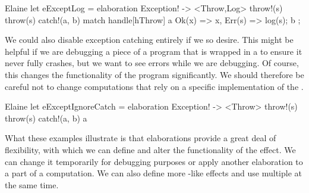 \begin{lst}{Elaine}
let eExceptLog = elaboration Exception! -> <Throw,Log> {
    throw!(s) { throw(s) }
    catch!(a, b) {
        match handle[hThrow] a {
            Ok(x) => x,
            Err(s) => {
                log(s);
                b
            }
        }
    }
};
\end{lst}
%
We could also disable exception catching entirely if we so desire. This might be helpful if we are debugging a piece of a program that is wrapped in a  to ensure it never fully crashes, but we want to see errors while we are debugging. Of course, this changes the functionality of the program significantly. We should therefore be careful not to change computations that rely on a specific implementation of the .

\begin{lst}{Elaine}
let eExceptIgnoreCatch = elaboration Exception! -> <Throw> {
    throw!(s) { throw(s) }
    catch!(a, b) { a }
}
\end{lst}
%
What these examples illustrate is that elaborations provide a great deal of flexibility, with which we can define and alter the functionality of the  effect. We can change it temporarily for debugging purposes or apply another elaboration to a part of a computation. We can also define more -like effects and use multiple at the same time.

